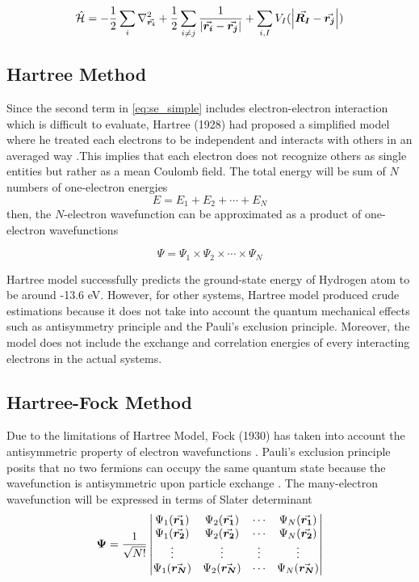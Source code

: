     \begin{equation} \label{eq:se_simple}
        \hat{\mathcal{H}}  = - \frac{1}{2} \sum_i \laplacian_{\va*{r_i}} + \frac{1}{2} \sum_{i\neq j} \frac{1}{\abs{\va*{r_i} - \va*{r_j}}} + \sum_{i,I} V_I(\abs{\va*{R_I} - \va*{r_j}})
    \end{equation}
    \subsection{Hartree Method}
    Since the second term in \eqref{eq:se_simple} includes electron-electron interaction which is difficult to evaluate, Hartree (1928) had proposed a simplified model where he treated each electrons to be independent and interacts with others in an averaged way \citep{Hartree1928}.This implies that each  electron does not recognize others as single entities but rather as a mean Coulomb field. The total energy will be sum of $N$ numbers of one-electron energies
    \begin{equation}
        E = E_1 + E_2 + \cdots + E_N
    \end{equation}
    then, the $N$-electron wavefunction can be approximated as a product of one-electron wavefunctions

    \begin{equation}
        \Psi = \Psi_1 \times \Psi_2 \times \cdots \times \Psi_N
    \end{equation}

    Hartree model successfully predicts the ground-state energy of Hydrogen atom to be around -13.6 eV. However, for other systems, Hartree model produced crude estimations because it does not take into account the quantum mechanical effects such as antisymmetry principle and the Pauli's exclusion principle. Moreover, the model does not include the exchange and correlation energies of every interacting electrons in the actual systems. 

\subsection{Hartree-Fock Method}
Due to the limitations of Hartree Model, Fock (1930) has taken into account the antisymmetric property of electron wavefunctions \citep{Fock1930}. Pauli's exclusion principle posits that no two fermions can occupy the same quantum state because the wavefunction is antisymmetric upon particle exchange \citep{Pauli1925}. The many-electron wavefunction will be expressed in terms of Slater determinant \citep{Slater1929}
\begin{equation}
   \mathbf{\Psi} = \frac{1}{\sqrt{N!}} \mdet{\Psi_1({\va*{r_1}}) & \Psi_2({\va*{r_1}}) & \cdots & \Psi_N({\va*{r_1}})  \\
   \Psi_1({\va*{r_2}}) & \Psi_2({\va*{r_2}}) & \cdots & \Psi_N({\va*{r_2}})\\
   \vdots & \vdots & \vdots & \vdots \\
   \Psi_1({\va*{r_N}}) & \Psi_2({\va*{r_N}}) & \cdots & \Psi_N({\va*{r_N}})
   }
\end{equation}

